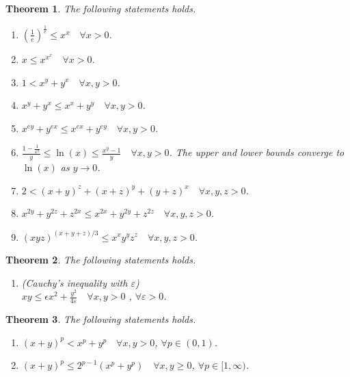 \documentclass[11pt,a4paper]{report}
\newtheorem{theorem}{Theorem}[section]
\theoremstyle{definition}
\begin{document}
\begin{theorem}
	The following statements holds.
	\begin{enumerate}[label=(\alph*)] 
		\rm\item $\displaystyle \left(\frac{1}{e}\right)^{\frac{1}{e}} \leq x^{x} \quad \forall x > 0$.
		\rm\item $\displaystyle x \leq x^{x^{x}} \quad \forall x > 0$.
		\rm\item $1 < x^{y}+y^{x}  \quad \forall x, y > 0$.
		\rm\item $x^{y}+y^{x} \leq x^{x}+y^{y} \quad \forall x, y > 0$.
		\rm\item $x^{e y}+y^{e x} \leq x^{e x}+y^{e y} \quad \forall x, y > 0$.
		\rm\item $\displaystyle \frac{1-\frac{1}{x^{y}}}{y} \leq \ln (x) \leq \frac{x^{y} - 1}{y} \quad \forall x, y > 0$. The upper and lower bounds converge to $\ln (x)$ as $y \rightarrow 0$.
		\rm\item $2 < (x+y)^{z}+(x+z)^{y}+(y+z)^{x} \quad \forall x, y, z > 0$.
		\rm\item $x^{2 y}+y^{2 z}+z^{2 x} \leq x^{2 x}+y^{2 y}+z^{2 z} \quad \forall x, y, z > 0$.
		\rm\item $(x y z)^{(x+y+z) / 3} \leq x^{x} y^{y} z^{z} \quad \forall x, y, z > 0$.
	\end{enumerate}
	
\end{theorem}

\begin{theorem}
	The following statements holds.
	\begin{enumerate}[label=(\alph*)] 
		\rm\item (Cauchy's inequality with $\varepsilon$)\\[0.1cm]
		$\displaystyle xy \leq \epsilon x^{2}+\frac{y^{2}}{4 \varepsilon} \quad \forall x, y>0$ , $\forall \varepsilon>0$.
	\end{enumerate}
\end{theorem}

\begin{theorem}
	The following statements holds.
	\begin{enumerate}[label=(\alph*)] 
		\rm\item $(x+y)^{p} < x^{p}+y^{p} \quad \forall x, y > 0$, $\forall p \in (0, 1)$.
		\rm\item $(x + y)^{p} \leq 2^{p - 1}\left(x^{p} + y^{p}\right) \quad \forall x, y \geq 0$, $\forall p \in [1, \infty)$.
	\end{enumerate}
\end{theorem}
\end{document}
